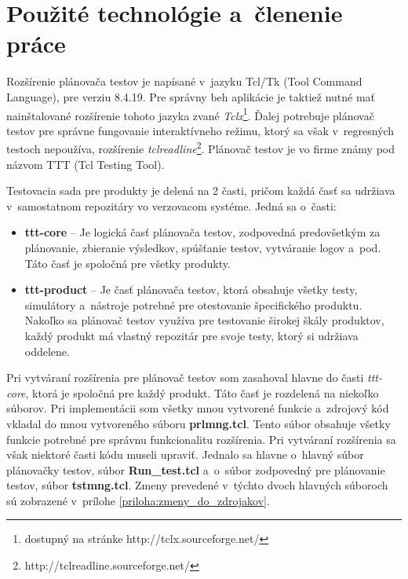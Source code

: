 \section{Použité technológie a~členenie práce}
\label{sekcia:pouzite_technologie}
Rozšírenie plánovača testov je napísané v~jazyku Tcl/Tk 
(Tool Command Language), pre verziu 8.4.19.
Pre správny beh aplikácie je taktiež nutné mať nainštalované rozšírenie 
tohoto jazyka zvané 
\textit{Tclx}\footnote{dostupný na stránke http://tclx.sourceforge.net/}.
Ďalej potrebuje plánovač testov pre správne fungovanie interaktívneho režimu, 
ktorý sa však v~regresných testoch nepoužíva, rozšírenie 
\textit{tclreadline}\footnote{http://tclreadline.sourceforge.net/}.
Plánovač testov je vo firme známy pod názvom TTT (Tcl Testing Tool).

Testovacia sada pre produkty je delená na 2 časti, 
pričom každá časť sa udržiava v~samostatnom repozitáry vo verzovacom 
systéme. Jedná sa o~časti: 
\begin{itemize}
\item \textbf{ttt-core} -- Je logická časť plánovača testov, zodpovedná 
predovšetkým za plánovanie, zbieranie výsledkov,
spúšťanie testov, vytváranie logov a~pod. 
Táto časť je spoločná pre všetky produkty. 
\item \textbf{ttt-product} -- Je časť plánovača testov, ktorá obsahuje 
všetky testy, simulátory a~nástroje potrebné pre otestovanie 
špecifického produktu. Nakoľko sa plánovač testov využíva pre testovanie 
širokej škály produktov, každý produkt má vlastný repozitár pre svoje 
testy, ktorý si udržiava oddelene.
\end{itemize} 

Pri vytváraní rozšírenia pre plánovač testov som zasahoval hlavne do 
časti \textit{ttt-core}, ktorá je spoločná pre každý produkt.
Táto časť je rozdelená na niekoľko súborov. Pri implementácii som všetky 
mnou vytvorené funkcie a~zdrojový kód vkladal do mnou vytvoreného súboru 
\textbf{prlmng.tcl}. 
Tento súbor obsahuje všetky funkcie potrebné pre správnu funkcionalitu 
rozšírenia. Pri vytváraní rozšírenia sa však niektoré časti kódu 
museli upraviť. 
Jednalo sa hlavne o~hlavný súbor plánovačky testov, súbor
\textbf{Run\_test.tcl} a~o~súbor zodpovedný pre plánovanie testov, 
súbor \textbf{tstmng.tcl}. 
Zmeny prevedené v~týchto dvoch hlavných súboroch sú zobrazené 
v~prílohe \ref{priloha:zmeny_do_zdrojakov}.

